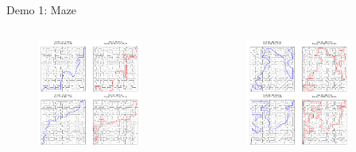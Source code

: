 \documentclass[aspectratio=169]{beamer}
\begin{document}
\begin{frame}{Demo 1: Maze}
    \begin{columns}[c]
        \begin{figure}
            \centering
            \includegraphics[width=0.8\textwidth]{../imgs/maze-1.png}
            \caption{}
        \end{figure}
        
        \begin{figure}
            \centering
            \includegraphics[width=0.8\textwidth]{../imgs/maze-2.png}
            \caption{}
        \end{figure}
    \end{columns}
\end{frame}
\end{document}

